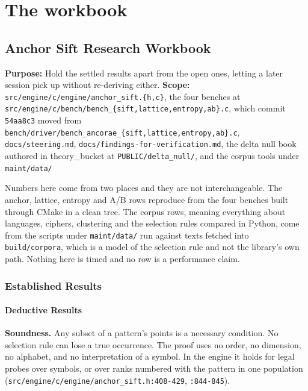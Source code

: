 \chapter{The workbook}

\section{Anchor Sift Research Workbook}

\textbf{Purpose:} Hold the settled results apart from the open ones, letting a later session pick up without re-deriving either. \textbf{Scope:} \texttt{src/\allowbreak{}engine/\allowbreak{}c/\allowbreak{}engine/\allowbreak{}anchor\_sift.\{h,c\}}, the four benches at \texttt{src/\allowbreak{}engine/\allowbreak{}c/\allowbreak{}bench/\allowbreak{}bench\_\{sift,lattice,entropy,ab\}.c}, which commit \texttt{54aa8c3} moved from \texttt{bench/\allowbreak{}driver/\allowbreak{}bench\_ancorae\_\{sift,lattice,entropy,ab\}.c}, \texttt{docs/\allowbreak{}steering.md}, \texttt{docs/\allowbreak{}findings-\allowbreak{}for-\allowbreak{}verification.md}, the delta null book authored in theory\_bucket at \texttt{PUBLIC/\allowbreak{}delta\_null/}, and the corpus tools under \texttt{maint/\allowbreak{}data/\allowbreak{}}

Numbers here come from two places and they are not interchangeable. The anchor, lattice, entropy and A/B rows reproduce from the four benches built through CMake in a clean tree. The corpus rows, meaning everything about languages, ciphers, clustering and the selection rules compared in Python, come from the scripts under \texttt{maint/\allowbreak{}data/\allowbreak{}} run against texts fetched into \texttt{build/\allowbreak{}corpora}, which is a model of the selection rule and not the library's own path. Nothing here is timed and no row is a performance claim.

\subsection{Established Results}

\subsubsection{Deductive Results}

\textbf{Soundness.} Any subset of a pattern's points is a necessary condition. No selection rule can lose a true occurrence. The proof uses no order, no dimension, no alphabet, and no interpretation of a symbol. In the engine it holds for legal probes over symbols, or over ranks numbered with the pattern in one population (\texttt{src/\allowbreak{}engine/\allowbreak{}c/\allowbreak{}engine/\allowbreak{}anchor\_sift.h:408-429}, \texttt{:844-845}).

